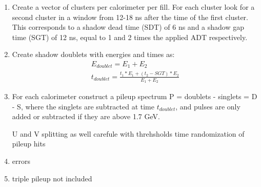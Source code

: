 \begin{enumerate}
	\item{Create a vector of clusters per calorimeter per fill. For each cluster look for a second cluster in a window from 12-18 ns after the time of the first cluster. This corresponds to a shadow dead time (SDT) of 6 ns and a shadow gap time (SGT) of 12 ns, equal to 1 and 2 times the applied ADT respectively.}
	\item{Create shadow doublets with energies and times as:
		\begin{gather*}
			E_{doublet} = E_{1} + E_{2} \\
			t_{doublet} = \frac{t_{1}*E_{1} + (t_{2}-SGT)*E_{2}}{E_{1} + E_{2}}
		\end{gather*}
		}
	\item{For each calorimeter construct a pileup spectrum P = doublets - singlets = D - S, where the singlets are subtracted at time $t_{doublet}$, and pulses are only added or subtracted if they are above 1.7 GeV.}


U and V splitting as well
carefule with threhsholds
time randomization of pileup hits

	\item{errors}
	\item{triple pileup not included}
\end{enumerate}










